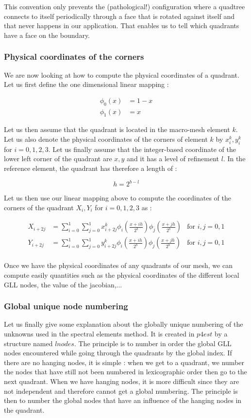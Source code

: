 This convention only prevents the (pathological!) configuration where a quadtree connects to itself periodically through a face that is rotated against itself and that never happens in our application. That enables us to tell which quadrants have a face on the boundary. 

\subsubsection{Physical coordinates of the corners}

We are now looking at how to compute the physical coordinates of a quadrant. Let us first define the one dimensional linear mapping : 

\begin{align*}
\phi_0(x) &= 1-x\\
\phi_1(x) &= x
\end{align*}

Let us then assume that the quadrant is located in the macro-mesh element $k$. Let us also denote the physical coordinates of the corners of element $k$ by $x^k_i,y^k_i$ for $i=0,1,2,3$. Let us finally assume that the integer-based coordinate of the lower left corner of the quadrant are $x,y$ and it has a level of refinement $l$. In the reference element, the quadrant has therefore a length of :

$$ h = 2^{b-l} $$ 

Let us then use our linear mapping above to compute the coordinates of the corners of the quadrant $X_i,Y_i$ for $i=0,1,2,3$ as : 

\begin{align*}
X_{i+2j} &= \sum_{i=0}^1\sum_{j=0}^1 x^k_{i+2j} \phi_i(\frac{x+ih}{2^b})\phi_j(\frac{x+jh}{2^b}) &\text{for $i,j=0,1$}\\ 
Y_{i+2j} &= \sum_{i=0}^1\sum_{j=0}^1 y^k_{i+2j} \phi_i(\frac{x+ih}{2^b})\phi_j(\frac{x+jh}{2^b}) &\text{for $i,j=0,1$}\\ 
\end{align*}


Once we have the physical coordinates of any quadrants of our mesh, we can compute easily quantities such as the physical coordinates of the different local GLL nodes, the value of the jacobian,...

\subsubsection{Global unique node numbering}

Let us finally give some explanation about the globally unique numbering of the unknowns used in the spectral elements method. It is created in $p4est$ by a structure named $lnodes$. The principle is to number in order the global GLL nodes encountered while going through the quadrants by the global index. If there are no hanging nodes, it is simple : when we get to a quadrant, we number the nodes that have still not been numbered in lexicographic order then go to the next quadrant. When we have hanging nodes, it is more difficult since they are not independent and therefore cannot get a global numbering. The principle is then to number the global nodes that have an influence of the hanging nodes in the quadrant. 


